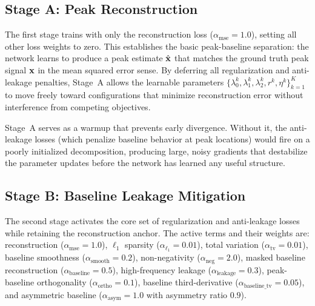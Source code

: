 \subsection{Stage A: Peak Reconstruction}
\label{sec:method_stage_a}

The first stage trains with only the reconstruction loss ($\alpha_{\text{mse}} = 1.0$), setting all other loss weights to zero. This establishes the basic peak-baseline separation: the network learns to produce a peak estimate $\hat{\mathbf{x}}$ that matches the ground truth peak signal $\mathbf{x}$ in the mean squared error sense. By deferring all regularization and anti-leakage penalties, Stage~A allows the learnable parameters $\{\lambda_0^k, \lambda_1^k, \lambda_2^k, r^k, \eta^k\}_{k=1}^K$ to move freely toward configurations that minimize reconstruction error without interference from competing objectives.

Stage~A serves as a warmup that prevents early divergence. Without it, the anti-leakage losses (which penalize baseline behavior at peak locations) would fire on a poorly initialized decomposition, producing large, noisy gradients that destabilize the parameter updates before the network has learned any useful structure.


\subsection{Stage B: Baseline Leakage Mitigation}
\label{sec:method_stage_b}

The second stage activates the core set of regularization and anti-leakage losses while retaining the reconstruction anchor. The active terms and their weights are: reconstruction ($\alpha_{\text{mse}} = 1.0$), $\ell_1$ sparsity ($\alpha_{\ell_1} = 0.01$), total variation ($\alpha_{\text{tv}} = 0.01$), baseline smoothness ($\alpha_{\text{smooth}} = 0.2$), non-negativity ($\alpha_{\text{neg}} = 2.0$), masked baseline reconstruction ($\alpha_{\text{baseline}} = 0.5$), high-frequency leakage ($\alpha_{\text{leakage}} = 0.3$), peak-baseline orthogonality ($\alpha_{\text{ortho}} = 0.1$), baseline third-derivative ($\alpha_{\text{baseline\_tv}} = 0.05$), and asymmetric baseline ($\alpha_{\text{asym}} = 1.0$ with asymmetry ratio $0.9$).

